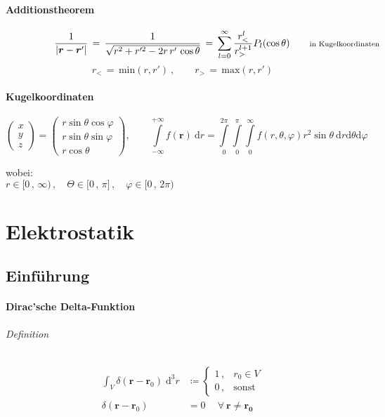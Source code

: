 \documentclass[titlepage,11pt,a4paper,ngerman]{report}
\renewcommand{\vec}[1]{\bm{#1}}
\renewcommand{\paragraph}[1]{\subsubsection{#1}}
\newcommand{\eq}{\,=\,}
\begin{document}
\paragraph{Additionstheorem}
\[\frac{1}{|\vec{r}-\vec{r}'|}\,=\,\frac{1}{\sqrt{r^2+r'^2-2r\,r'\,\cos\theta}}\,=\,\sum_{l=0}^{\infty}\frac{r_<^l}{r_>^{l+1}}P_l(\cos\theta)\qquad\rlap{\scriptsize{in Kugelkoordinaten}}\]
\[r_<\eq \mathrm{min}(r,r')\ ,\qquad r_>\eq \mathrm{max}(r,r')\]


\paragraph{Kugelkoordinaten}
$$
\begin{pmatrix}
	x \\ y\\ z
\end{pmatrix}
=
\begin{pmatrix}
	r \sin \theta \cos \varphi\\
	r \sin \theta \sin \varphi\\
	r \cos \theta
\end{pmatrix}
, \qquad \int\limits_{-\infty}^{+\infty} f(\vec{r})\ \textrm{d}r = \int\limits_{0}^{2 \pi} \int\limits_{0}^{\pi} \int\limits_{0}^{\infty} f(r,\theta,\varphi) r^2 \sin \theta\ \textrm{d}r \textrm{d}\theta \textrm{d}\varphi
$$

wobei:\\
$r\in \lbrack0\, ,\,\infty)\, ,\quad \Theta\in\lbrack 0\, ,\, \pi\rbrack\, , \quad \varphi\in\lbrack 0\, ,\, 2\pi) $


\chapter{Elektrostatik}

\section{Einführung}
\paragraph{Dirac'sche Delta-Funktion}
\subparagraph{Definition}

\begin{align*}
\int_{V} \delta(\vec{r}-\vec{r}_0) \; \text{d}^3r &\coloneqq
	\begin{cases} 
		1 \, , & r_0 \in V \\
		0 \, , & \text{sonst}
	\end{cases} \\
\delta(\vec{r}-\vec{r}_0) &= 0 \quad \ \forall \: \vec{r} \neq \vec{r_0}
\end{align*}
\end{document}
